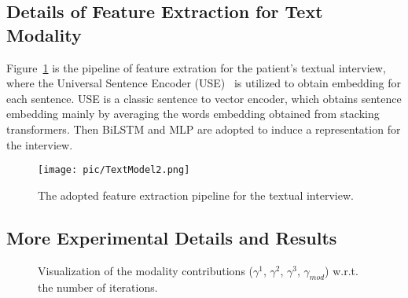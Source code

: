 \documentclass{article}
\begin{document}
\subsection{Details of Feature Extraction for Text Modality}

Figure~\ref{fig:text} is the pipeline of feature extration for the patient's textual interview, where the Universal Sentence Encoder (USE)~\cite{USE} is utilized to obtain embedding for each sentence.
USE is a classic sentence to vector encoder, which obtains sentence embedding mainly by averaging the words embedding obtained from stacking transformers.
Then BiLSTM and MLP are adopted to induce a representation for the interview.


\begin{figure}[htb]
	\centering
	\texttt{[image: pic/TextModel2.png]}
	\caption{The adopted feature extraction pipeline for the textual interview.}
	\label{fig:text}
\end{figure}

\subsection{More Experimental Details and Results}


\begin{figure*}[!t]
	\centering
    \label{fig:vis}
    \caption{Visualization of the modality contributions ($\gamma^1$, $\gamma^2$, $\gamma^3$, $\gamma_{mod}$) w.r.t. the number of iterations.
    }
\end{figure*}
\end{document}
